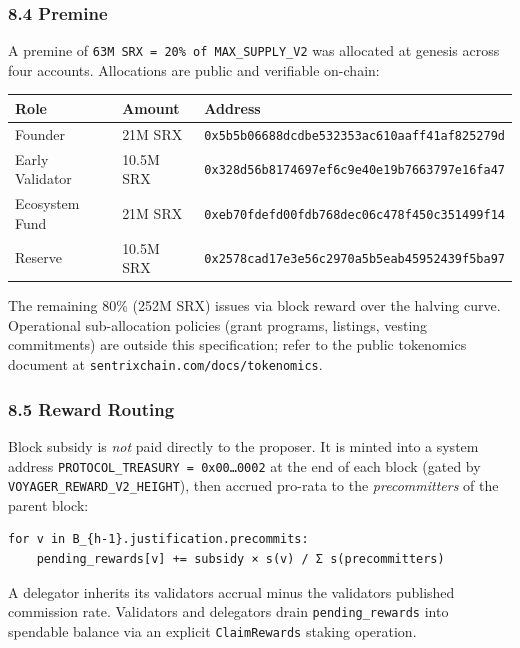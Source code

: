 \documentclass[11pt,a4paper]{article}
\begin{document}
\hypertarget{84-premine}{%
\subsubsection{8.4 Premine}\label{84-premine}}

A premine of \texttt{63M\ SRX\ =\ 20\%\ of\ MAX\_SUPPLY\_V2} was
allocated at genesis across four accounts. Allocations are public and
verifiable on-chain:

\begin{longtable}[]{@{}lll@{}}
\toprule\noalign{}
Role & Amount & Address \\
\midrule\noalign{}
\endhead
\bottomrule\noalign{}
\endlastfoot
Founder & 21M SRX &
\texttt{0x5b5b06688dcdbe532353ac610aaff41af825279d} \\
Early Validator & 10.5M SRX &
\texttt{0x328d56b8174697ef6c9e40e19b7663797e16fa47} \\
Ecosystem Fund & 21M SRX &
\texttt{0xeb70fdefd00fdb768dec06c478f450c351499f14} \\
Reserve & 10.5M SRX &
\texttt{0x2578cad17e3e56c2970a5b5eab45952439f5ba97} \\
\end{longtable}

The remaining 80\% (252M SRX) issues via block reward over the halving
curve. Operational sub-allocation policies (grant programs, listings,
vesting commitments) are outside this specification; refer to the public
tokenomics document at \texttt{sentrixchain.com/docs/tokenomics}.

\hypertarget{85-reward-routing}{%
\subsubsection{8.5 Reward Routing}\label{85-reward-routing}}

Block subsidy is \emph{not} paid directly to the proposer. It is minted
into a system address \texttt{PROTOCOL\_TREASURY\ =\ 0x00…0002} at the
end of each block (gated by \texttt{VOYAGER\_REWARD\_V2\_HEIGHT}), then
accrued pro-rata to the \emph{precommitters} of the parent block:

\begin{verbatim}
for v in B_{h-1}.justification.precommits:
    pending_rewards[v] += subsidy × s(v) / Σ s(precommitters)
\end{verbatim}

A delegator inherits its validator\textquotesingle s accrual minus the
validator\textquotesingle s published commission rate. Validators and
delegators drain \texttt{pending\_rewards} into spendable balance via an
explicit \texttt{ClaimRewards} staking operation.
\end{document}
